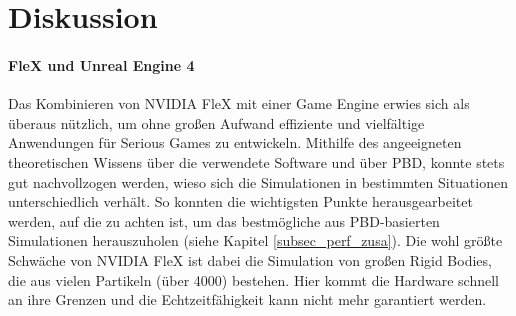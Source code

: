 \chapter{Diskussion}



\subsubsection{FleX und Unreal Engine 4}
Das Kombinieren von NVIDIA FleX mit einer Game Engine erwies sich als überaus nützlich, um ohne großen Aufwand effiziente und vielfältige Anwendungen für Serious Games zu entwickeln. 
Mithilfe des angeeigneten theoretischen Wissens über die verwendete Software und über PBD, konnte stets gut nachvollzogen werden, wieso sich die Simulationen in bestimmten Situationen unterschiedlich verhält. 
So konnten die wichtigsten Punkte herausgearbeitet werden, auf die zu achten ist, um das bestmögliche aus PBD-basierten Simulationen herauszuholen (siehe Kapitel \ref{subsec_perf_zusa}). Die wohl größte Schwäche von NVIDIA FleX ist dabei die Simulation von großen Rigid Bodies, die aus vielen Partikeln (über 4000) bestehen. Hier kommt die Hardware schnell an ihre Grenzen und die Echtzeitfähigkeit kann nicht mehr garantiert werden.


